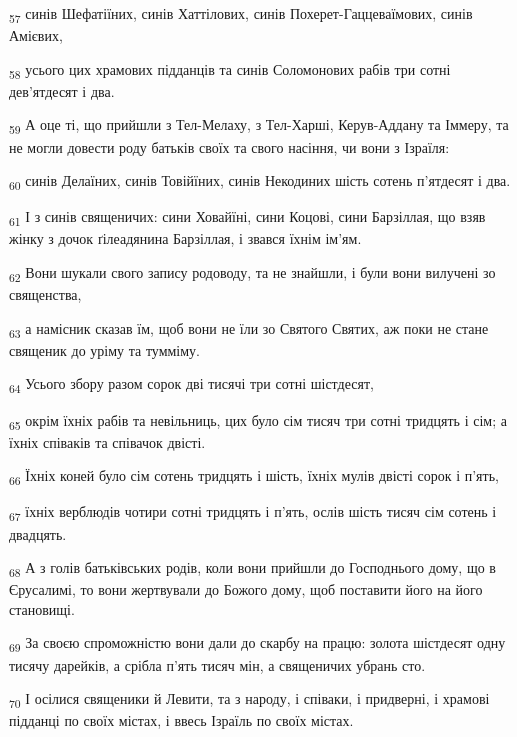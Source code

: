 \begin{tcolorbox}
\textsubscript{57} синів Шефатіїних, синів Хаттілових, синів Похерет-Гаццеваїмових, синів Амієвих,
\end{tcolorbox}
\begin{tcolorbox}
\textsubscript{58} усього цих храмових підданців та синів Соломонових рабів три сотні дев'ятдесят і два.
\end{tcolorbox}
\begin{tcolorbox}
\textsubscript{59} А оце ті, що прийшли з Тел-Мелаху, з Тел-Харші, Керув-Аддану та Іммеру, та не могли довести роду батьків своїх та свого насіння, чи вони з Ізраїля:
\end{tcolorbox}
\begin{tcolorbox}
\textsubscript{60} синів Делаїних, синів Товійїних, синів Некодиних шість сотень п'ятдесят і два.
\end{tcolorbox}
\begin{tcolorbox}
\textsubscript{61} І з синів священичих: сини Ховайїні, сини Коцові, сини Барзіллая, що взяв жінку з дочок ґілеадянина Барзіллая, і звався їхнім ім'ям.
\end{tcolorbox}
\begin{tcolorbox}
\textsubscript{62} Вони шукали свого запису родоводу, та не знайшли, і були вони вилучені зо священства,
\end{tcolorbox}
\begin{tcolorbox}
\textsubscript{63} а намісник сказав їм, щоб вони не їли зо Святого Святих, аж поки не стане священик до уріму та тумміму.
\end{tcolorbox}
\begin{tcolorbox}
\textsubscript{64} Усього збору разом сорок дві тисячі три сотні шістдесят,
\end{tcolorbox}
\begin{tcolorbox}
\textsubscript{65} окрім їхніх рабів та невільниць, цих було сім тисяч три сотні тридцять і сім; а їхніх співаків та співачок двісті.
\end{tcolorbox}
\begin{tcolorbox}
\textsubscript{66} Їхніх коней було сім сотень тридцять і шість, їхніх мулів двісті сорок і п'ять,
\end{tcolorbox}
\begin{tcolorbox}
\textsubscript{67} їхніх верблюдів чотири сотні тридцять і п'ять, ослів шість тисяч сім сотень і двадцять.
\end{tcolorbox}
\begin{tcolorbox}
\textsubscript{68} А з голів батьківських родів, коли вони прийшли до Господнього дому, що в Єрусалимі, то вони жертвували до Божого дому, щоб поставити його на його становищі.
\end{tcolorbox}
\begin{tcolorbox}
\textsubscript{69} За своєю спроможністю вони дали до скарбу на працю: золота шістдесят одну тисячу дарейків, а срібла п'ять тисяч мін, а священичих убрань сто.
\end{tcolorbox}
\begin{tcolorbox}
\textsubscript{70} І осілися священики й Левити, та з народу, і співаки, і придверні, і храмові підданці по своїх містах, і ввесь Ізраїль по своїх містах.
\end{tcolorbox}
